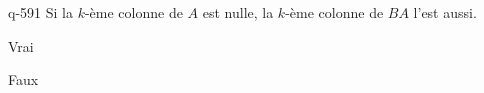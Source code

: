 \begin{truefalse}{q-591}
Si la $k$-ème colonne de $A$ est nulle, la $k$-ème colonne de $BA$ l'est aussi.
\item* Vrai
\item Faux
\end{truefalse}

